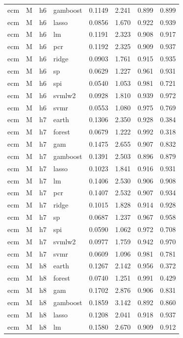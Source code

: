 \begin{ThreePartTable}
\begin{longtable}[t]{llclcccc}
ecm & M & h6 & gamboost & 0.1149 & 2.241 & 0.899 & 0.899\\
ecm & M & h6 & lasso & 0.0856 & 1.670 & 0.922 & 0.939\\
ecm & M & h6 & lm & 0.1191 & 2.323 & 0.908 & 0.917\\
ecm & M & h6 & pcr & 0.1192 & 2.325 & 0.909 & 0.937\\
ecm & M & h6 & ridge & 0.0903 & 1.761 & 0.915 & 0.935\\
ecm & M & h6 & sp & 0.0629 & 1.227 & 0.961 & 0.931\\
ecm & M & h6 & spi & 0.0540 & 1.053 & 0.981 & 0.721\\
ecm & M & h6 & svmlw2 & 0.0928 & 1.810 & 0.939 & 0.972\\
ecm & M & h6 & svmr & 0.0553 & 1.080 & 0.975 & 0.769\\
\addlinespace
ecm & M & h7 & earth & 0.1306 & 2.350 & 0.928 & 0.384\\
ecm & M & h7 & forest & 0.0679 & 1.222 & 0.992 & 0.318\\
ecm & M & h7 & gam & 0.1475 & 2.655 & 0.907 & 0.832\\
ecm & M & h7 & gamboost & 0.1391 & 2.503 & 0.896 & 0.879\\
ecm & M & h7 & lasso & 0.1023 & 1.841 & 0.916 & 0.931\\
ecm & M & h7 & lm & 0.1406 & 2.530 & 0.906 & 0.908\\
ecm & M & h7 & pcr & 0.1407 & 2.532 & 0.907 & 0.934\\
ecm & M & h7 & ridge & 0.1015 & 1.828 & 0.914 & 0.928\\
ecm & M & h7 & sp & 0.0687 & 1.237 & 0.967 & 0.958\\
ecm & M & h7 & spi & 0.0590 & 1.062 & 0.972 & 0.708\\
ecm & M & h7 & svmlw2 & 0.0977 & 1.759 & 0.942 & 0.970\\
ecm & M & h7 & svmr & 0.0609 & 1.096 & 0.981 & 0.781\\
\addlinespace
ecm & M & h8 & earth & 0.1267 & 2.142 & 0.956 & 0.372\\
ecm & M & h8 & forest & 0.0740 & 1.251 & 0.991 & 0.429\\
ecm & M & h8 & gam & 0.1702 & 2.876 & 0.906 & 0.831\\
ecm & M & h8 & gamboost & 0.1859 & 3.142 & 0.892 & 0.860\\
ecm & M & h8 & lasso & 0.1208 & 2.041 & 0.918 & 0.937\\
ecm & M & h8 & lm & 0.1580 & 2.670 & 0.909 & 0.912\\

\end{longtable}
\end{ThreePartTable}
